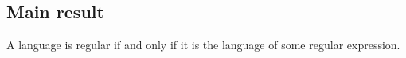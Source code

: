 
\subsection*{Main result}

A language is regular if and only if it is the language of some regular expression.

\blankpage